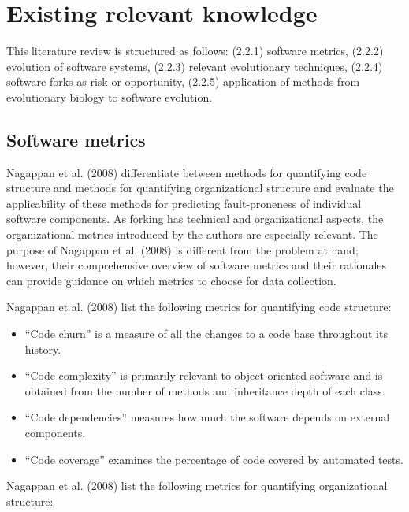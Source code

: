 \section{Existing relevant knowledge}

This literature review is structured as follows: (2.2.1) software metrics, (2.2.2) evolution of software systems, (2.2.3) relevant evolutionary techniques, (2.2.4) software forks as risk or opportunity, (2.2.5) application of methods from evolutionary biology to software evolution.

\subsection{Software metrics}
Nagappan et al. (2008) differentiate between methods for quantifying code structure and methods for quantifying organizational structure and evaluate the applicability of these methods for predicting fault-proneness of individual software components. As forking has technical and organizational aspects, the organizational metrics introduced by the authors are especially relevant. The purpose of Nagappan et al. (2008) is different from the problem at hand; however, their comprehensive overview of software metrics and their rationales can provide guidance on which metrics to choose for data collection.

\noindent
Nagappan et al. (2008) list the following metrics for quantifying code structure:

\begin{itemize}
  \item{“Code churn” is a measure of all the changes to a code base throughout its history.}
  \item{“Code complexity” is primarily relevant to object-oriented software and is obtained from the number of methods and inheritance depth of each class.}
  \item{“Code dependencies” measures how much the software depends on external components.}
  \item{“Code coverage” examines the percentage of code covered by automated tests.}
\end{itemize}

\noindent
Nagappan et al. (2008) list the following metrics for quantifying organizational structure:

